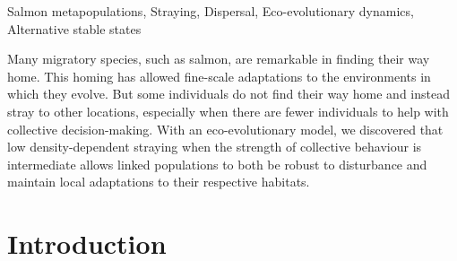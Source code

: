 \documentclass{revtex4}
\begin{document}

\maketitle

\centerline{Salmon metapopulations, Straying, Dispersal, Eco-evolutionary dynamics, Alternative stable states}
\vspace{2mm}
Many migratory species, such as salmon, are remarkable in finding their way home. This homing has allowed fine-scale adaptations to the environments in which they evolve. But some individuals do not find their way home and instead stray to other locations, especially when there are fewer individuals to help with collective decision-making. With an eco-evolutionary model, we discovered that low density-dependent straying when the strength of collective behaviour is intermediate  allows linked populations to both be robust to disturbance and maintain local adaptations to their respective habitats.\\



\section{Introduction}
\end{document}
